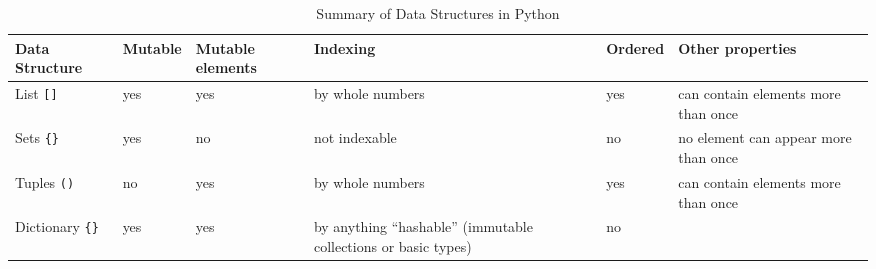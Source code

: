 \documentclass[11pt]{cselabheader}
\begin{document}
\begin{table}[!ht]
  \centering
  \begin{tabular}{p{1.6cm}lp{1.6cm}p{3.5cm}lp{4.5cm}}
    \toprule
    Data Structure & Mutable & Mutable elements & Indexing & Ordered
    & Other
    properties\\
    \midrule
    List \lstinline![]! & yes & yes & by whole numbers & yes & can contain elements more than once\\
    Sets \lstinline!{}! & yes & no & not indexable & no & no element can appear more than once\\
    Tuples \lstinline!()! & no & yes & by whole numbers & yes & can contain elements more than
    once\\
    Dictionary \lstinline!{}! & yes & yes & by anything ``hashable'' (immutable collections or
    basic types) & no & \\
    \bottomrule
  \end{tabular}
  \caption{Summary of Data Structures in Python}
  \label{tab:sum}
\end{table}
\end{document}
